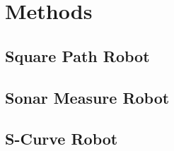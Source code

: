 \documentclass[main.tex]{subfiles}
\begin{document}
\section{Methods}

\subsection{Square Path Robot}

\subsection{Sonar Measure Robot}

\subsection{S-Curve Robot}
\end{document}
